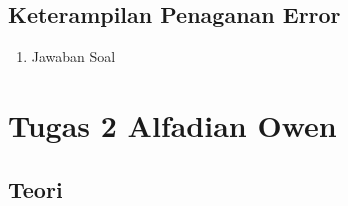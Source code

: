 \subsection{Keterampilan Penaganan Error}
\begin{enumerate}
\item Jawaban Soal 


\end{enumerate}


\section{Tugas 2 Alfadian Owen}
\subsection{Teori}
